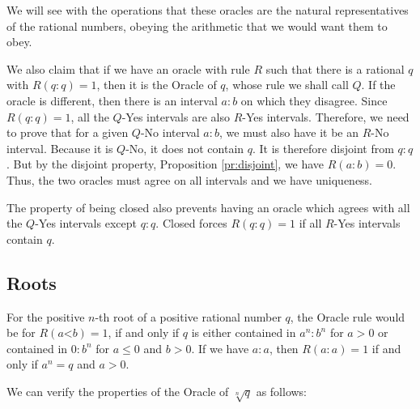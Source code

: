 \documentclass[12pt]{article}
\theoremstyle{remark}
\newcommand{\lt}{\mathord{<}}
\begin{document}
We will see with the operations that these oracles are the natural representatives of the rational numbers, obeying the arithmetic that we would want them to obey.  

We also claim that if we have an oracle with rule $R$ such that there is a rational $q$ with $R(q:q)=1$, then it is the Oracle of $q$, whose rule we shall call $Q$. If the oracle is different, then there is an interval $a:b$ on which they disagree. Since $R(q:q) =1$, all the  $Q$-Yes intervals are also $R$-Yes intervals. Therefore, we need to prove that for a given  $Q$-No interval $a:b$, we must also have it be an $R$-No interval. Because it is $Q$-No, it does not contain $q$. It is therefore disjoint from $q:q$. But by the disjoint property, Proposition \ref{pr:disjoint}, we have $R(a:b)=0$. Thus, the two oracles must agree on all intervals and we have uniqueness. 

The property of being closed also prevents having an oracle which agrees with all the $Q$-Yes intervals except $q:q$. Closed forces $R(q:q)=1$ if all $R$-Yes intervals contain $q$.

\subsection{Roots}

For the positive $n$-th root of a positive rational number $q$, the Oracle rule would be for $R(a\lt b) = 1$, if and only if $q$ is either contained in $a^n:b^n$ for $a>0$ or contained in $0:b^n$ for $a \leq 0$ and $b>0$. If we have $a:a$, then $R(a:a) = 1$ if and only if $a^n = q$ and $a>0$.

We can verify the properties of the Oracle of $\sqrt[n]{q}$ as follows: 
\end{document}
